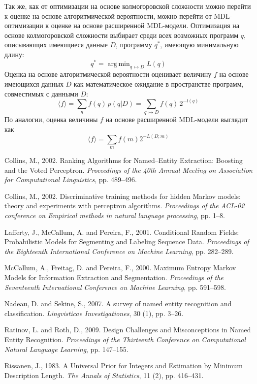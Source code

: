 \documentclass[12pt,a4paper]{article}
\DeclareMathOperator*{\argmin}{arg\,min}
\begin{document}
Так же, как от оптимизации на основе колмогоровской сложности можно
перейти к оценке на основе алгоритмической вероятности, можно перейти от
MDL-оптимизации к оценке на основе расширенной MDL-модели. Оптимизация
на основе колмогоровской сложности выбирает среди всех возможных
программ $q$, описывающих имеющиеся данные $D$, программу $q^*$, имеющую
минимальную длину:
\[
q^* = \argmin_{q \, \mapsto D} L(q)
\]
Оценка на основе алгоритмической вероятности оценивает величину $f$ на
основе имеющихся данных $D$ как математическое ожидание в пространстве
программ, совместимых с данными $D$:
\[
\langle f \rangle = \sum_q f(q) \, p(q|D) =
  \sum_{q \, \mapsto D} f(q) \, 2^{-l(q)}
\]
По аналогии, оценка величины $f$ на основе расширенной MDL-модели
выглядит как 
\[
\langle f \rangle = \sum_m f(m) 2^{-L(D;m)}
\]

\begin{thebibliography}{9}

Collins, M., 2002.
Ranking Algorithms for Named–Entity Extraction:
Boosting and the Voted Perceptron.
\textit{Proceedings of the 40th Annual Meeting on Association for
Computational Linguistics}, pp. 489–496.

Collins, M., 2002.
Discriminative training methods for hidden Markov models:
theory and experiments with perceptron algorithms.
\textit{Proceedings of the ACL-02 conference on Empirical methods in
natural language processing}, pp. 1–8.

Lafferty, J., McCallum, A. and Pereira, F., 2001.
Conditional Random Fields: Probabilistic Models for Segmenting and
Labeling Sequence Data. \textit{Proceedings of the Eighteenth
International Conference on Machine Learning}, pp. 282–289.

McCallum, A., Freitag, D. and Pereira, F., 2000.
Maximum Entropy Markov Models for Information Extraction and
Segmentation. \textit{Proceedings of the Seventeenth International
Conference on Machine Learning}, pp. 591–598.

Nadeau, D. and Sekine, S., 2007.
A survey of named entity recognition and classification.
\textit{Lingvisticae Investigationes}, 30 (1), pp. 3–26.

Ratinov, L. and Roth, D., 2009.
Design Challenges and Misconceptions in Named Entity Recognition.
\textit{Proceedings of the Thirteenth Conference on Computational
Natural Language Learning}, pp. 147–155.

Rissanen, J., 1983.
A Universal Prior for Integers and Estimation by Minimum Description
Length. \textit{The Annals of Statistics}, 11 (2), pp. 416–431.

\end{thebibliography}
\end{document}
